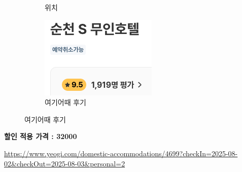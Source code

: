 \documentclass[10pt]{article}
\begin{document}
\begin{figure}[htbp]
\begin{subfigure}{0.3\textwidth}
    \caption{위치}
    \label{fig:2}
  \end{subfigure}
  \hfill
  \begin{subfigure}{0.3\textwidth}
    \centering
    \includegraphics[width=\linewidth]{fig/순천S무인호텔_후기.png}
    \caption{여기어때 후기}
    \label{fig:3}
  \end{subfigure}
  \label{fig:three}
\end{figure}
\begin{center}
\textbf{할인 적용 가격 : 32000}
\end{center}
\url{https://www.yeogi.com/domestic-accommodations/4699?checkIn=2025-08-02&checkOut=2025-08-03&personal=2}

\newpage
\end{document}
